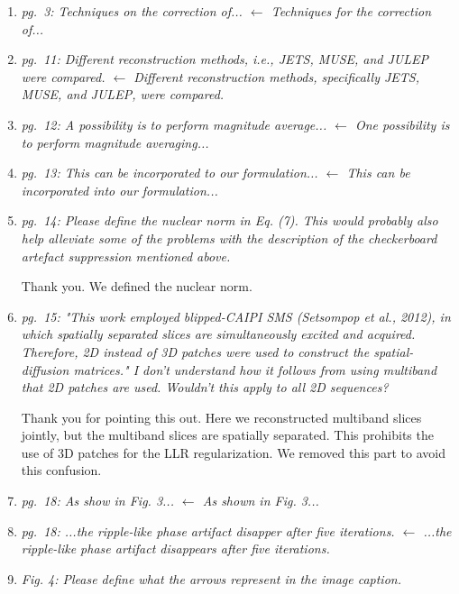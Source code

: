 \documentclass[a4paper,11pt,twoside]{report}
\begin{document}
\begin{enumerate}[resume]
    \item \textit{pg.~3: Techniques on the correction of... $\leftarrow$ Techniques for the correction of...}
    \item \textit{pg.~11: Different reconstruction methods, i.e., JETS, MUSE, and JULEP were compared. $\leftarrow$ Different reconstruction methods, specifically JETS, MUSE, and JULEP, were compared.}
    \item \textit{pg.~12: A possibility is to perform magnitude average... $\leftarrow$ One possibility is to perform magnitude averaging...}
    \item \textit{pg.~13: This can be incorporated to our formulation... $\leftarrow$ This can be incorporated into our formulation...}
    \item \textit{pg.~14: Please define the nuclear norm in Eq. (7). This would probably also help alleviate some of the problems with the description of the checkerboard artefact suppression mentioned above.}

    \hspace{1em} {\color{blue} Thank you. We defined the nuclear norm.}

    \item \textit{pg.~15: "This work employed blipped-CAIPI SMS (Setsompop et al., 2012), in which spatially separated slices are simultaneously excited and acquired. Therefore, 2D instead of 3D patches were used to construct the spatial-diffusion matrices." I don't understand how it follows from using multiband that 2D patches are used. Wouldn't this apply to all 2D sequences?}

    \hspace{1em} {\color{blue} Thank you for pointing this out.
    Here we reconstructed multiband slices jointly,
    but the multiband slices are spatially separated.
    This prohibits the use of 3D patches
    for the LLR regularization.
    We removed this part to avoid this confusion.}

    \item \textit{pg.~18: As show in Fig. 3... $\leftarrow$ As shown in Fig. 3...}
    \item \textit{pg.~18: ...the ripple-like phase artifact disapper after five iterations. $\leftarrow$ ...the ripple-like phase artifact disappears after five iterations.}
    \item \textit{Fig. 4: Please define what the arrows represent in the image caption.}


\end{enumerate}
\end{document}
